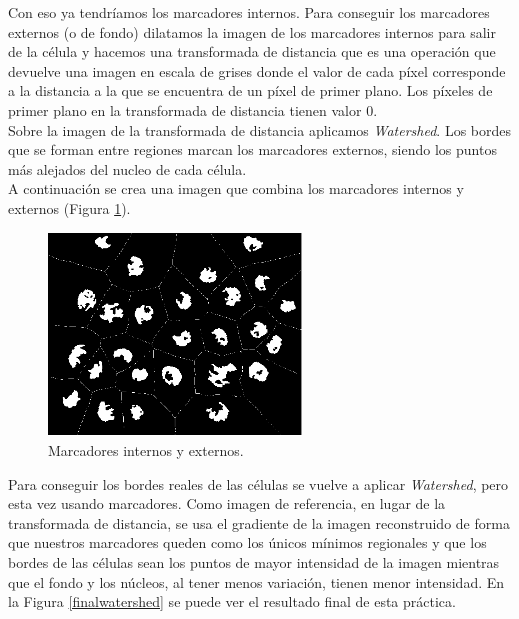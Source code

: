 Con eso ya tendríamos los marcadores internos. Para conseguir los marcadores externos (o de fondo) dilatamos la imagen de los marcadores internos para salir de la célula y hacemos una transformada de distancia que es una operación que devuelve una imagen en escala de grises donde el valor de cada píxel corresponde a la distancia a la que se encuentra de un píxel de primer plano. Los píxeles de primer plano en la transformada de distancia tienen valor 0.\\

Sobre la imagen de la transformada de distancia aplicamos  \emph{Watershed}. Los bordes que se forman entre regiones marcan los marcadores externos, siendo los puntos más alejados del nucleo de cada célula.\\

A continuación se crea una imagen que combina los marcadores internos y externos (Figura \ref{marcadores}). \\

\begin{figure}[h]
\centering
\includegraphics[width=0.6\textwidth]{imagenes/marcadores}
\caption{Marcadores internos y externos.}
\label{marcadores} 
\end{figure}

Para conseguir los bordes reales de las células se vuelve a aplicar  \emph{Watershed}, pero esta vez usando marcadores. Como imagen de referencia, en lugar de la transformada de distancia, se usa el gradiente de la imagen reconstruido de forma que nuestros marcadores queden como los únicos mínimos regionales y que los bordes de las células sean los puntos de mayor intensidad de la imagen mientras que el fondo y los núcleos, al tener menos variación, tienen menor intensidad. En la Figura \ref{finalwatershed} se puede ver el resultado final de esta práctica.\\


